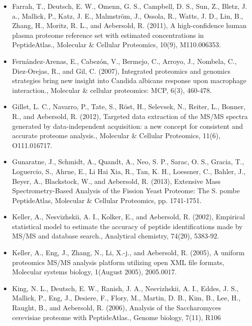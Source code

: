 \begin{itemize}
\item[]{
Farrah, T., Deutsch, E. W., Omenn, G. S., Campbell, D. S., Sun, Z., Bletz, J. a., Mallick, P., Katz,
J. E., Malmström, J., Ossola, R., Watts, J. D., Lin, B., Zhang, H., Moritz, R. L., 
and Aebersold, R. (2011), A high-confidence human plasma proteome reference set with estimated
concentrations in PeptideAtlas., Molecular \& Cellular Proteomics, 10(9), M110.006353.
}

\item[]{
Fern\'andez-Arenas, E., Cabez\'on, V., Bermejo, C., Arroyo, J., Nombela, C., Diez-Orejas, R.,
and Gil, C. (2007), Integrated proteomics and genomics strategies bring new insight into
Candida albicans response upon macrophage interaction., 
Molecular \& cellular proteomics: MCP, 6(3), 460-478.
}

\item[]{
Gillet, L. C., Navarro, P., Tate, S., Röst, H., Selevsek, N., Reiter, L., Bonner, R., and Aebersold,
R. (2012), Targeted data extraction of the MS/MS spectra generated by data-independent
acquisition: a new concept for consistent and accurate proteome analysis., Molecular \&
Cellular Proteomics, 11(6), O111.016717.
}

\item[]{
Gunaratne, J., Schmidt, A., Quandt, A., Neo, S. P., Sarac, O. S., Gracia, T., Loguercio, S.,
Ahrne, E., Li Hai Xia, R., Tan, K. H., Loessner, C., Bahler, J., Beyer, A., Blackstock, W., and
Aebersold, R. (2013), Extensive Mass Spectrometry-Based Analysis of the Fission Yeast
Proteome: The S. pombe PeptideAtlas, Molecular \& Cellular Proteomics, pp. 1741-1751.
}

\item[]{
Keller, A., Nesvizhskii, A. I., Kolker, E., and Aebersold, R. (2002), Empirical statistical model
to estimate the accuracy of peptide identifications made by MS/MS and database search.,
Analytical chemistry, 74(20), 5383-92.
}

\item[]{
Keller, A., Eng, J., Zhang, N., Li, X.-j., and Aebersold, R. (2005), A uniform proteomics MS/MS
analysis platform utilizing open XML file formats, Molecular systems biology, 1(August
2005), 2005.0017.
}

\item[]{
King, N. L., Deutsch, E. W., Ranish, J. A., Nesvizhskii, A. I., Eddes, J. S., Mallick, P., Eng, J.,
Desiere, F., Flory, M., Martin, D. B., Kim, B., Lee, H., Raught, B., and Aebersold, R. (2006),
Analysis of the Saccharomyces cerevisiae proteome with PeptideAtlas., Genome biology,
7(11), R106
}


\end{itemize}
